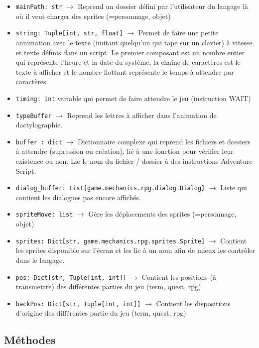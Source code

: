 \documentclass{report}
\begin{document}
\begin{itemize}
  \item \texttt{mainPath: str} $\rightarrow$ Reprend un dossier défini par l'utilisateur du langage là où il veut charger des sprites (=personnage, objet)
  \item \texttt{string: Tuple[int, str, float]} $\rightarrow$ Permet de faire une petite annimation avec le texte (imitant quelqu'un qui tape sur un clavier) à vitesse et texte définis dans un script. Le premier composant est un nombre entier qui représente l'heure et la date du système, la chaîne de caractères est le texte à afficher et le nombre flottant représente le temps à attendre par caractères.
  \item \texttt{timing: int} variable qui permet de faire attendre le jeu (instruction WAIT)
  \item \texttt{typeBuffer} $\rightarrow$ Reprend les lettres à afficher dans l'animation de dactylographie.
  \item \texttt{buffer : dict} $\rightarrow$ Dictionnaire complexe qui reprend les fichiers et dossiers à attendre (supression ou création), lié à une fonction pour vérifier leur existence ou non. Lie le nom du fichier / dossier à des instructions Adventure Script.
  \item \texttt{dialog_buffer: List[game.mechanics.rpg.dialog.Dialog]} $\rightarrow$ Liste qui contient les dialogues pas encore affichés.
  \item \texttt{spriteMove: list} $\rightarrow$ Gère les déplacements des sprites (=personnage, objet)
  \item \texttt{sprites: Dict[str, game.mechanics.rpg.sprites.Sprite]} $\rightarrow$ Contient les sprites disponible sur l'écran et les lie à un nom afin de mieux les contrôler dans le langage.
  \item \texttt{pos: Dict[str, Tuple[int, int]]} $\rightarrow$ Contient les positions (à transmettre) des différentes parties du jeu (term, quest, rpg)
  \item \texttt{backPos: Dict[str, Tuple[int, int]]} $\rightarrow$ Contient les dispositions d'origine des différentes partie du jeu (term, quest, rpg)
\end{itemize}
\subsection*{Méthodes}
\end{document}
